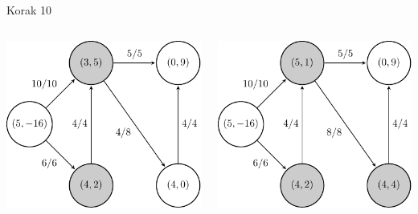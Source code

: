 \documentclass{beamer}
\begin{document}
\begin{frame}{Korak 10}
    \begin{columns}
        \begin{column}{0.5\textwidth}
            \centering
            \includegraphics[scale=0.7]{../writing/images/graf2-11.pdf}
        \end{column}

        \begin{column}{0.5\textwidth}
            \centering
            \includegraphics[scale=0.7]{../writing/images/graf2-12.pdf}
        \end{column}
    \end{columns}
\end{frame}
\end{document}
